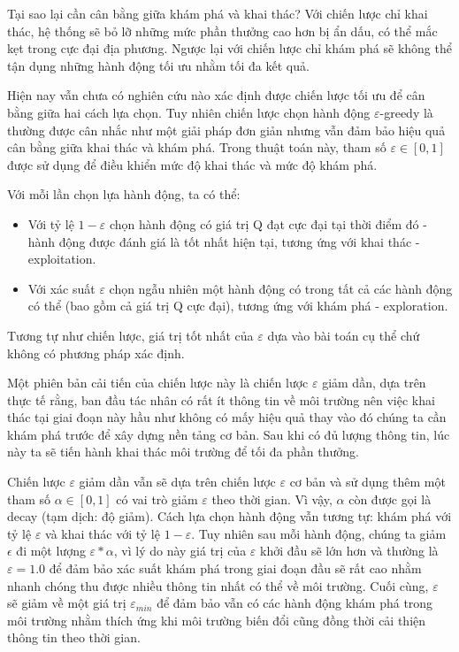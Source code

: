 Tại sao lại cần cân bằng giữa khám phá và khai thác? Với chiến lược chỉ khai thác, hệ thống sẽ bỏ lỡ những mức phần thưởng cao hơn bị ẩn dấu, có thể mắc kẹt trong cực đại địa phương. Ngược lại với chiến lược chỉ khám phá sẽ không thể tận dụng những hành động tối ưu nhằm tối đa kết quả.

Hiện nay vẫn chưa có nghiên cứu nào xác định được chiến lược tối ưu để cân bằng giữa hai cách lựa chọn. Tuy nhiên chiến lược chọn hành động $\varepsilon$-greedy là thường được cân nhắc như một giải pháp đơn giản nhưng vẫn đảm bảo hiệu quả cân bằng giữa khai thác và khám phá. Trong thuật toán này, tham số $\varepsilon \in [0, 1]$ được sử dụng để điều khiển mức độ khai thác và mức độ khám phá.

Với mỗi lần chọn lựa hành động, ta có thể:

\begin{itemize}
    \item Với tỷ lệ $1 - \varepsilon$ chọn hành động có giá trị Q đạt cực đại tại thời điểm đó - hành động được đánh giá là tốt nhất hiện tại, tương ứng với khai thác - exploitation.
    \item Với xác suất $\varepsilon$ chọn ngẫu nhiên một hành động có trong tất cả các hành động có thể (bao gồm cả giá trị Q cực đại), tương ứng với khám phá - exploration.
\end{itemize}

Tương tự như chiến lược, giá trị tốt nhất của $\varepsilon$ dựa vào bài toán cụ thể chứ không có phương pháp xác định.

Một phiên bản cải tiến của chiến lược này là chiến lược $\varepsilon$ giảm dần, dựa trên thực tế rằng, ban đầu tác nhân có rất ít thông tin về môi trường nên việc khai thác tại giai đoạn này hầu như không có mấy hiệu quả thay vào đó chúng ta cần khám phá trước để xây dựng nền tảng cơ bản. Sau khi có đủ lượng thông tin, lúc này ta sẽ tiến hành khai thác môi trường để tối đa phần thưởng.

Chiến lược $\varepsilon$ giảm dần vẫn sẽ dựa trên chiến lược $\varepsilon$ cơ bản và sử dụng thêm một tham số $\alpha \in [0, 1]$ có vai trò giảm $\varepsilon$ theo thời gian. Vì vậy, $\alpha$ còn được gọi là decay (tạm dịch: độ giảm). Cách lựa chọn hành động vẫn tương tự: khám phá với tỷ lệ $\varepsilon$ và khai thác với tỷ lệ $1 - \varepsilon$. Tuy nhiên sau mỗi hành động, chúng ta giảm $\epsilon$ đi một lượng $\varepsilon * \alpha$, vì lý do này giá trị của $\varepsilon$ khởi đầu sẽ lớn hơn và thường là $\varepsilon = 1.0$ để đảm bảo xác suất khám phá trong giai đoạn đầu sẽ rất cao nhằm nhanh chóng thu được nhiều thông tin nhất có thể về môi trường. Cuối cùng, $\varepsilon$ sẽ giảm về một giá trị $\varepsilon_{min}$ để đảm bảo vẫn có các hành động khám phá trong môi trường nhằm thích ứng khi môi trường biến đổi cũng đồng thời cải thiện thông tin theo thời gian.

